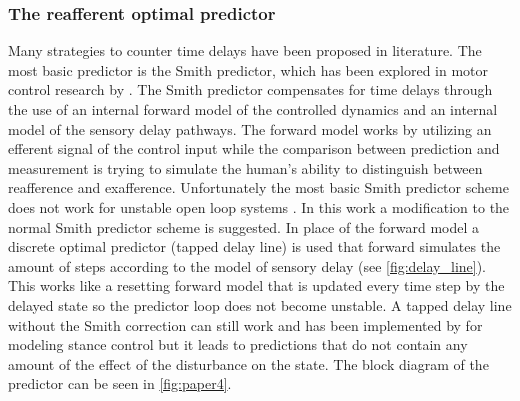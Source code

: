 \subsubsection{The reafferent optimal predictor}
Many strategies to counter time delays have been proposed in literature. The most basic predictor is the Smith predictor, which has been explored in motor control research by \citet{miall1993cerebellum}. The Smith predictor compensates for time delays through the use of an internal forward model of the controlled dynamics and an internal model of the sensory delay pathways. The forward model works by utilizing an efferent signal of the control input while the comparison between prediction and measurement is trying to simulate the human's ability to distinguish between reafference and exafference.  Unfortunately the  most basic Smith predictor scheme does not work for unstable open loop systems \cite{smith1957closed}. In this work a modification to the normal Smith predictor scheme is suggested. In place of the forward model a discrete optimal predictor (tapped delay line) is used that forward simulates the amount of steps according to the model of sensory delay (see \cref{fig:delay_line}). This works like a resetting forward model that is updated every time step by the delayed state so the predictor loop does not become unstable. A tapped delay line without the Smith  correction can still work and has been implemented by \citet{van2001adaptive} for modeling stance control but it leads to predictions that do not contain any amount of the effect of the disturbance on the state. The block diagram of the predictor can be seen in \cref{fig:paper4}.

